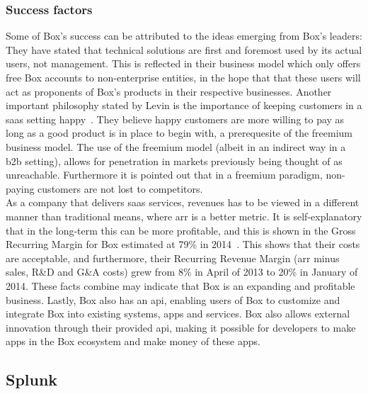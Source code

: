 {\subsubsection{Success factors}
Some of Box's success can be attributed to the ideas emerging from Box's leaders: They have stated that technical solutions are first and foremost used by its actual users, not management. This is reflected in their business model which only offers free Box accounts to non-enterprise entities, in the hope that that these users will act as proponents of Box's products in their respective businesses. Another important philosophy stated by Levin is the importance of keeping customers in a \gls{saas} setting happy~\cite{tientzuozuora2014}\cite{youtube2011}. They believe happy customers are more willing to pay as long as a good product is in place to begin with, a prerequesite of the freemium business model. The use of the freemium model (albeit in an indirect way in a \gls{b2b} setting), allows for penetration in markets previously being thought of as unreachable. Furthermore it is pointed out that in a freemium paradigm, non-paying customers are not lost to competitors.
\newline
\\
As a company that delivers \gls{saas} services, revenues has to be viewed in a different manner than traditional means, where \gls{arr} is a better metric. It is self-explanatory that in the long-term this can be more profitable, and this is shown in the Gross Recurring Margin for Box estimated at 79\% in 2014~\cite{tientzuozuora2014}. This shows that their costs are acceptable, and furthermore, their Recurring Revenue Margin (\gls{arr} minus sales, R\&D and G\&A costs) grew from 8\% in April of 2013 to 20\% in January of 2014. These facts combine may indicate that Box is an expanding and profitable business. Lastly, Box also has an \gls{api}, enabling users of Box to customize and integrate Box into existing systems, apps and services. Box also allows external innovation through their provided \gls{api}, making it possible for developers to make apps in the Box ecosystem and make money of these apps. 

\subsection{Splunk}
}
